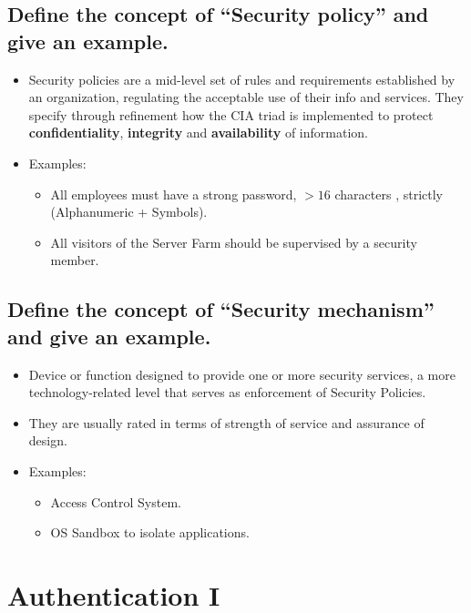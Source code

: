 \documentclass[9pt, letterpaper]{article}
\begin{document}
\subsection{Define the concept of “Security policy” and give an example.}
\begin{itemize}
	\item Security policies are a mid-level set of rules and requirements established by an organization, regulating the acceptable use of their info and services. They specify through refinement how the CIA triad is implemented to protect \textbf{confidentiality}, \textbf{integrity} and \textbf{availability} of information.
	\item Examples:
	      \begin{itemize}
		      \item All employees must have a strong password, $>16$ characters , strictly (Alphanumeric + Symbols).
		      \item  All visitors of the Server Farm should be supervised by a security member.
	      \end{itemize}
\end{itemize}


\subsection{Define the concept of “Security mechanism” and give an example.}
\begin{itemize}
	\item Device or function designed to provide one or more security services, a more technology-related level that serves as enforcement of Security Policies.
	\item They are usually rated in terms of strength of service and assurance of design.
	\item Examples:
	      \begin{itemize}
		      \item Access Control System.
		      \item OS Sandbox to isolate applications.
	      \end{itemize}
\end{itemize}

\newpage

\section{Authentication I}
\end{document}
